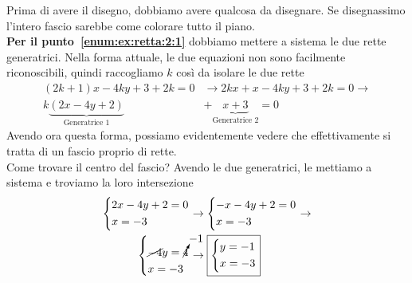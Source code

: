 Prima di avere il disegno, dobbiamo avere qualcosa da disegnare. Se disegnassimo l'intero fascio 
sarebbe come colorare tutto il piano.\\
\textbf{Per il punto~\ref{enum:ex:retta:2:1}} dobbiamo mettere a sistema le due rette generatrici.
Nella forma attuale, le due equazioni non sono facilmente riconoscibili, quindi raccogliamo $k$ così
da isolare le due rette
\begin{align*}
  (2k+1)x -4ky + 3 + 2k = 0 &\rightarrow 2kx+x-4ky+3+2k = 0 \rightarrow\\
  k\underbrace{(2x-4y+2)}_{\text{Generatrice 1}}&+\underbrace{x+3}_{\text{Generatrice 2}} = 0
\end{align*}
Avendo ora questa forma, possiamo evidentemente vedere che effettivamente si tratta di un fascio 
proprio di rette.\\
Come trovare il centro del fascio? Avendo le due generatrici, le mettiamo a sistema e troviamo la loro
intersezione
\begin{align*}
  \begin{dcases}
    2x-4y+2=0\\
    x=-3
  \end{dcases} &\rightarrow
  \begin{dcases}
    -x-4y+2=0\\
    x=-3
  \end{dcases} \rightarrow\\
  \begin{dcases}
    \cancel{-4}y = \cancelto{-1}{4}\\
    x=-3
  \end{dcases} &\rightarrow
  \boxed{\begin{dcases}
      y = -1\\
      x = -3
  \end{dcases}}
\end{align*}

